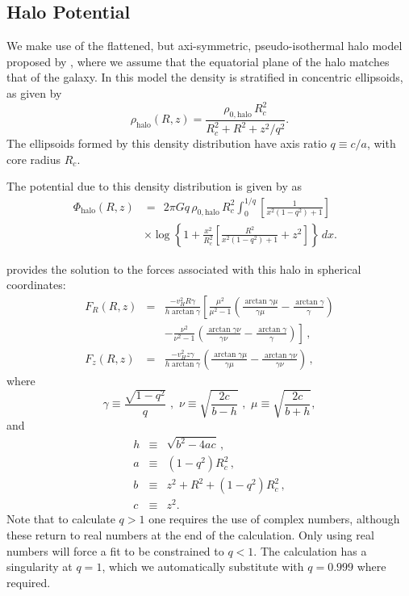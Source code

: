 \documentclass[useAMS,usenatbib]{mn2e}
\begin{document}
\subsection{Halo Potential}
We make use of the flattened, but axi-symmetric, pseudo-isothermal halo model 
proposed by \citet{Sackett1994A}, where we assume that the equatorial plane 
of the halo matches that of the galaxy.
In this model the density is stratified in concentric ellipsoids, as given by 
\begin{equation}
\rho_\textrm{halo}(R,z) = \frac{\rho_{0,\textrm{halo}}\,R_c^2}{R_c^2 + R^2 + z^2/q^2}.
\end{equation}
The ellipsoids formed by this density distribution have axis ratio 
$q\equiv c/a$, with core radius $R_c$.

The potential due to this density distribution is given by 
\citet{Sackett1990A} as
\begin{eqnarray}
\Phi_\textrm{halo}(R,z) &=\ \  2 \pi G q \,\rho_{0,\textrm{halo}} \,R_c^2 \int_0^{1/q} \left[\frac{1}{x^2(1-q^2) + 1}\right]&\nonumber \\ &\times  \log\left\{1+\frac{x^2}{R_c^2} \left[\frac{R^2}{x^2(1-q^2) +1}+z^2\right]\right\}\,dx.& 
\end{eqnarray}

\citet{Sackett1994A} provides the solution to the forces associated with this 
halo in spherical coordinates:
\begin{eqnarray}
F_R(R,z) &=& \frac{-v_H^2 R \gamma}{h \arctan \gamma} \left[ \frac{\mu^2}{\mu^2-1} \left(\frac{\arctan \gamma\mu}{\gamma\mu} - \frac{\arctan\gamma}{\gamma}\right)\right.\label{eqn:halor} \nonumber \\ 
&&\left.- \frac{\nu^2}{\nu^2-1} \left(\frac{\arctan \gamma\nu}{\gamma \nu} - \frac{\arctan \gamma}{\gamma} \right) \right] \,,\\
F_z(R,z) &=& \frac{-v_H^2 z \gamma}{h \arctan \gamma}\left(\frac{\arctan \gamma\mu}{\gamma \mu} - \frac{\arctan \gamma \nu}{\gamma \nu}\right)\,,\label{eqn:haloz}
\end{eqnarray}
where
\begin{equation}
\gamma \equiv \frac{\sqrt{1-q^2}}{q}\,\, ,\,\, \nu\equiv \sqrt{\frac{2c}{b-h}}\,\,,\,\, \mu\equiv\sqrt{\frac{2c}{b+h}},
\end{equation}
and
\begin{eqnarray}
h&\equiv&\sqrt{b^2-4ac}  \, ,\\
a &\equiv& (1-q^2) R_c^2 \, ,\\
b &\equiv& z^2 + R^2 + (1-q^2) R_c^2 \, ,\\
c &\equiv& z^2.
\end{eqnarray}
Note that to calculate $q>1$ one requires the use of complex numbers, although these return to real numbers at the end of the calculation. Only using real numbers will force a fit to be constrained to $q<1$.
The calculation has a singularity at $q=1$, which we automatically substitute with $q=0.999$ where required.
\end{document}

